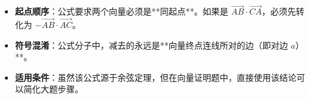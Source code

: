 \begin{trapbox}
\begin{itemize}
    \item \textbf{起点顺序}：公式要求两个向量必须是**同起点**。如果是 $\vec{AB} \cdot \vec{CA}$，必须先转化为 $-\vec{AB} \cdot \vec{AC}$。
    \item \textbf{符号混淆}：公式分子中，减去的永远是**向量终点连线所对的边（即对边 $a$）**。
    \item \textbf{适用条件}：虽然该公式源于余弦定理，但在向量证明题中，直接使用该结论可以简化大题步骤。
\end{itemize}
\end{trapbox}